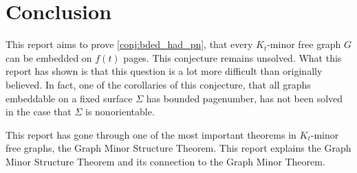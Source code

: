 \chapter{Conclusion}\label{chap:conclusion}

This report aims to prove \cref{conj:bded_had_pn}, that every $K_t$-minor free graph $G$ can be embedded on $f(t)$ pages. This conjecture remains unsolved. What this report has shown is that this question is a lot more difficult than originally believed. In fact, one of the corollaries of this conjecture, that all graphs embeddable on a fixed surface $\Sigma$ has bounded pagenumber, has not been solved in the case that $\Sigma$ is nonorientable. 

This report has gone through one of the most important theorems in $K_t$-minor free graphs, the Graph Minor Structure Theorem. This report explains the Graph Minor Structure Theorem and its connection to the Graph Minor Theorem. 